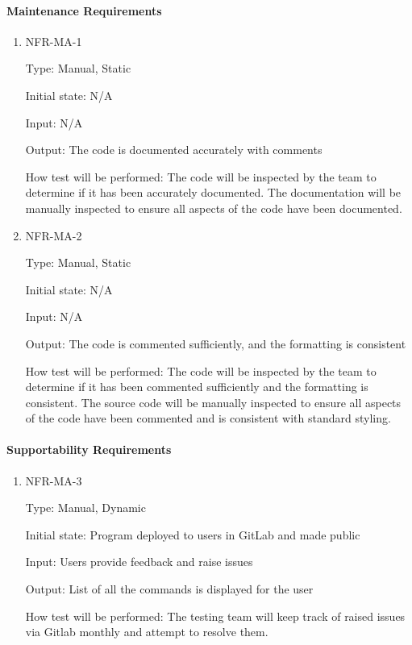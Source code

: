 \documentclass[12pt, titlepage]{article}
\begin{document}
\paragraph{Maintenance Requirements}

\begin{enumerate}

\item{NFR-MA-1\\}

Type: Manual, Static 

Initial state: N/A 

Input: N/A 

Output: The code is documented accurately with comments 

How test will be performed: The code will be inspected by the team to determine if it has been accurately documented. The documentation will be manually inspected to ensure all aspects of the code have been documented.

\item{NFR-MA-2\\}

Type: Manual, Static 

Initial state: N/A 

Input: N/A 

Output: The code is commented sufficiently, and the formatting is consistent 

How test will be performed: The code will be inspected by the team to determine if it has been commented sufficiently and the formatting is consistent. The source code will be manually inspected to ensure all aspects of the code have been commented and is consistent with standard styling.

\end{enumerate}

\paragraph{Supportability Requirements}

\begin{enumerate}

\item{NFR-MA-3\\}

Type: Manual, Dynamic 

Initial state: Program deployed to users in GitLab and made public 

Input: Users provide feedback and raise issues 

Output: List of all the commands is displayed for the user 

How test will be performed: The testing team will keep track of raised issues via Gitlab monthly and attempt to resolve them.

\end{enumerate}
\end{document}
